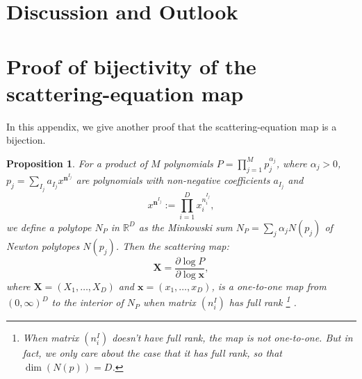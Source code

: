 \documentclass[12pt]{article}
\theoremstyle{definition}
\theoremstyle{plain}
\newtheorem*{pro*}{Proposition}
\begin{document}
\section{Discussion and Outlook}


\appendix

\section*{Proof of bijectivity of the scattering-equation map}

In this appendix, we give another proof that the scattering-equation map is a bijection.

\begin{pro*}
	For a product of $M$ polynomials $P=\prod_{j=1}^M p_j^{\alpha_j}$, 
	where $\alpha_j>0$, 
	$p_j=\sum_{I_{j}} a_{{I_j}} x^{\mathbf{n}^{I_j}}$ are polynomials with non-negative coefficients $a_{I_j}$ and
	\[
		x^{\mathbf{n}^{I_j}}:=\prod_{i=1}^D x_i^{n^{I_j}_i},
	\]
	we define a polytope $N_P$ in $\mathbb R^D$ as the Minkowski sum $N_P=\sum_j \alpha_j N(p_j)$ of Newton polytopes $N(p_j)$.
	Then the scattering map:
	\[
		\mathbf{X}=\frac{\partial \log P}{\partial \log \mathbf{x}},
	\]
	where $\mathbf{X}=(X_{1},\ldots,X_{D})$ and $\mathbf{x}=(x_{1},\ldots,x_{D})$, is a one-to-one map from $(0,\infty)^D$ to the interior of $N_P$ when matrix $(n_i^I)$ has full rank%
	\footnote{When matrix $(n_i^I)$ doesn't have full rank, the map is not one-to-one. 
		But in fact, we only care about the case that it has full rank, so that $\dim (N(p))=D$. 
		}%
		. 
	\end{pro*}
	
\end{document}
